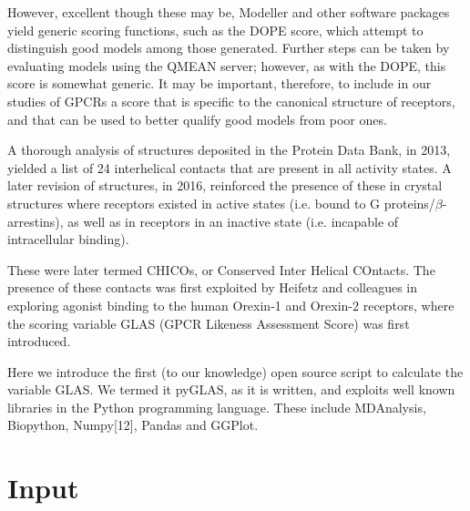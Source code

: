 \documentclass[12pt]{article}
\begin{document}
However, excellent though these may be, Modeller and other software packages yield generic scoring functions, such as the DOPE score\cite{Shen2006}, which attempt to distinguish good models among those generated. Further steps can be taken by evaluating models using the QMEAN server\cite{Benkert2008}; however, as with the DOPE, this score is somewhat generic. It may be important, therefore, to include in our studies of GPCRs a score that is specific to the canonical structure of receptors, and that can be used to better qualify good models from poor ones.

A thorough analysis of structures deposited in the Protein Data Bank, in 2013, yielded a list of 24 interhelical contacts that are present in all activity states\cite{Venkatakrishnan2013}. A later revision of structures, in 2016, reinforced the presence of these in crystal structures where receptors existed in active states (i.e. bound to G proteins/$\beta$-arrestins), as well as in receptors in an inactive state (i.e. incapable of intracellular binding)\cite{Cvicek2016}. 

These were later termed CHICOs, or Conserved Inter Helical COntacts\cite{Cvicek2016}. The presence of these contacts was first exploited by Heifetz and colleagues\cite{Heifetz2013} in exploring agonist binding to the human Orexin-1 and Orexin-2 receptors, where the scoring variable GLAS (GPCR Likeness Assessment Score) was first introduced.

Here we introduce the first (to our knowledge) open source script to calculate the variable GLAS. We termed it pyGLAS, as it is written, and exploits well known libraries in the Python programming language. These include MDAnalysis\cite{Michauld-Agrawal2011}, Biopython\cite{Cock2009}, Numpy[12], Pandas\cite{McKinney2010} and GGPlot.

\section{Input}
\end{document}
